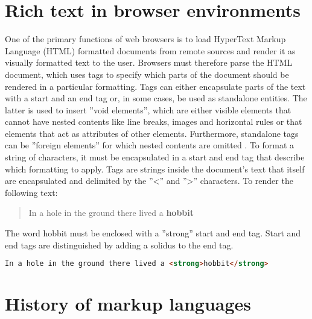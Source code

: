 \section{Rich text in browser environments}

One of the primary functions of web browsers is to load HyperText Markup Language (HTML) formatted documents from remote sources and render it as visually formatted text to the user. Browsers must therefore parse the HTML document, which uses tags to specify which parts of the document should be rendered in a particular formatting. Tags can either encapsulate parts of the text with a start and an end tag or, in some cases, be used as standalone entities. 
The latter is used to insert ''void elements'', which are either visible elements that cannot have nested contents like line breaks, images and horizontal rules or that elements that act as attributes of other elements. Furthermore, standalone tags can be ''foreign elements'' for which nested contents are omitted \cite[Elements]{HTML5}. 
To format a string of characters, it must be encapsulated in a start and end tag that describe which formatting to apply. Tags are strings inside the document's text that itself are encapsulated and delimited by the ''<'' and ''>'' characters. To render the following text: 

\begin{quotation}
In a hole in the ground there lived a \textbf{hobbit}
\end{quotation}

The word hobbit must be enclosed with a ''strong'' start and end tag. Start and end tags are distinguished by adding a solidus to the end tag.

\begin{lstlisting}[language=html, caption=Text formatted as bold, label=lst:div-contenteditable]
In a hole in the ground there lived a <strong>hobbit</strong>
\end{lstlisting}



\section{History of markup languages}